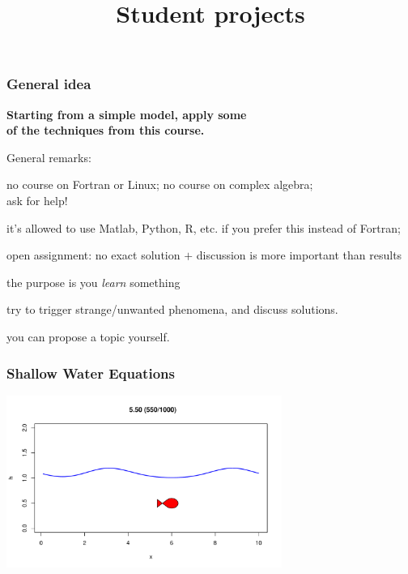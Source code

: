 \documentclass[aspectratio=43,9pt]{beamer}
\title{Student projects}%
\begin{document}
%
%
\begin{frame}[plain]
	\titlepage
\end{frame}
%
%
%
%
%
\begin{frame}
	\frametitle{General idea}
	\begin{center}
		\bf Starting from a simple model, apply some\\
		of the techniques from this course.
	\end{center}
	\par\vspace*{4ex}
	General remarks:
	\begin{myitemize}{1ex}
		\item no course on Fortran or Linux; no course on complex algebra;\\ask for help!
		\item it's allowed to use Matlab, Python, R, etc. if you prefer this instead of Fortran;
		\item open assignment: no exact solution $+$ discussion is more important than results
		\item the purpose is you \emph{learn} something
		\item try to trigger strange/unwanted phenomena, and discuss solutions.
		\item you can propose a topic yourself.
	\end{myitemize}
\end{frame}
%
%
\begin{frame}
	\frametitle{Shallow Water Equations}
	\begin{center}
		\includegraphics[width=9cm]{swe1D}
	\end{center}
\end{frame}
\end{document}
